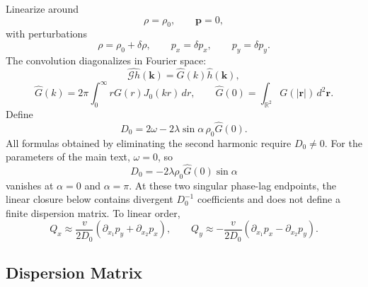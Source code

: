 \documentclass[11pt]{article}
\numberwithin{equation}{section}
\begin{document}
Linearize around
\begin{equation}
  \rho=\rho_0,\qquad \mathbf p=0,
\end{equation}
with perturbations
\begin{equation}
  \rho=\rho_0+\delta\rho,\qquad
  p_x=\delta p_x,\qquad
  p_y=\delta p_y .
\end{equation}
The convolution diagonalizes in Fourier space:
\begin{equation}
  \widehat{\mathcal Gh}(\mathbf k)=\widehat G(k)\widehat h(\mathbf k),
\end{equation}
\begin{equation}
  \widehat G(k)=2\pi\int_0^\infty rG(r)J_0(kr)\,dr,
  \qquad
  \widehat G(0)=\int_{\mathbb R^2}G(|\mathbf r|)\,d^2\mathbf r .
\end{equation}
Define
\begin{equation}
  D_0=2\omega-2\lambda\sin\alpha\,\rho_0\widehat G(0).
\end{equation}
All formulas obtained by eliminating the second harmonic require
$D_0\ne0$. For the parameters of the main text, $\omega=0$, so
\begin{equation}
  D_0=-2\lambda\rho_0\widehat G(0)\sin\alpha
\end{equation}
vanishes at $\alpha=0$ and $\alpha=\pi$. At these two singular phase-lag endpoints,
the linear closure below contains divergent $D_0^{-1}$ coefficients and
does not define a finite dispersion matrix.
To linear order,
\begin{equation}
  Q_x\approx\frac{v}{2D_0}(\partial_{x_1}p_y+\partial_{x_2}p_x),
  \qquad
  Q_y\approx-\frac{v}{2D_0}(\partial_{x_1}p_x-\partial_{x_2}p_y).
\end{equation}

\subsection{Dispersion Matrix}
\end{document}
